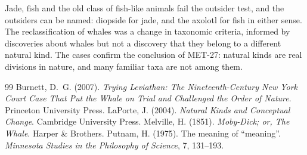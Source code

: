 \documentclass{situationist-preprint}
\begin{document}
Jade, fish and the old class of fish-like animals fail the outsider test, and the outsiders can be named: diopside for jade, and the axolotl for fish in either sense. The reclassification of whales was a change in taxonomic criteria, informed by discoveries about whales but not a discovery that they belong to a different natural kind. The cases confirm the conclusion of MET-27: natural kinds are real divisions in nature, and many familiar taxa are not among them.

\begin{thebibliography}{99}\small
{} Burnett, D.~G. (2007). \emph{Trying Leviathan: The Nineteenth-Century New York Court Case That Put the Whale on Trial and Challenged the Order of Nature}. Princeton University Press.
 LaPorte, J. (2004). \emph{Natural Kinds and Conceptual Change}. Cambridge University Press.
 Melville, H. (1851). \emph{Moby-Dick; or, The Whale}. Harper \& Brothers.
 Putnam, H. (1975). The meaning of \enquote{meaning}. \emph{Minnesota Studies in the Philosophy of Science}, 7, 131--193.
\end{thebibliography}
\end{document}
